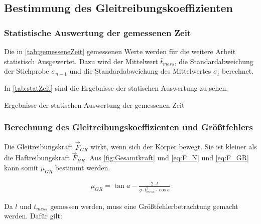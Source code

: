 \subsection{Bestimmung des Gleitreibungskoeffizienten}

\subsubsection{Statistische Auswertung der gemessenen Zeit}

Die in \autoref{tab:gemesseneZeit} gemessenen Werte werden für die weitere Arbeit statistisch Ausgewertet. Dazu wird der Mittelwert $\bar{t}_{mess}$, die Standardabweichung der Stichprobe $\sigma_{n-1}$ und die Standardabweichung des Mittelwertes $\sigma_{\bar{t}}$ berechnet.

In \autoref{tab:statZeit} sind die Ergebnisse der statischen Auswertung zu sehen.

\begin{table}[h]
    \center 
    \caption[Statistische Auswertung der gemessenen Zeit]{Ergebnisse der statischen Auswertung der gemessenen Zeit}
    
    \label{tab:statZeit}
\end{table}

\subsubsection{Berechnung des Gleitreibungskoeffizienten und Größtfehlers}

Die Gleitreibungskraft $\vec{F}_{GR}$ wirkt, wenn sich der Körper bewegt. Sie ist kleiner als die Haftreibungskraft $\vec{F}_{HR}$. Aus \autoref{fig:Gesamtkraft} und \autoref{eq:F_N} und \autoref{eq:F_GR} kann somit $\mu_{GR}$ bestimmt werden.

\begin{align}
  \mu_{GR} = \tan{a} - \frac{2\cdot l}{g \cdot t_{mess}^2 \cdot \cos{a}}
  \label{eq:muGR}
\end{align}

Da $l$ und $t_{mess}$ gemessen werden, muss eine Größtfehlerbetrachtung gemacht werden. Dafür gilt:

